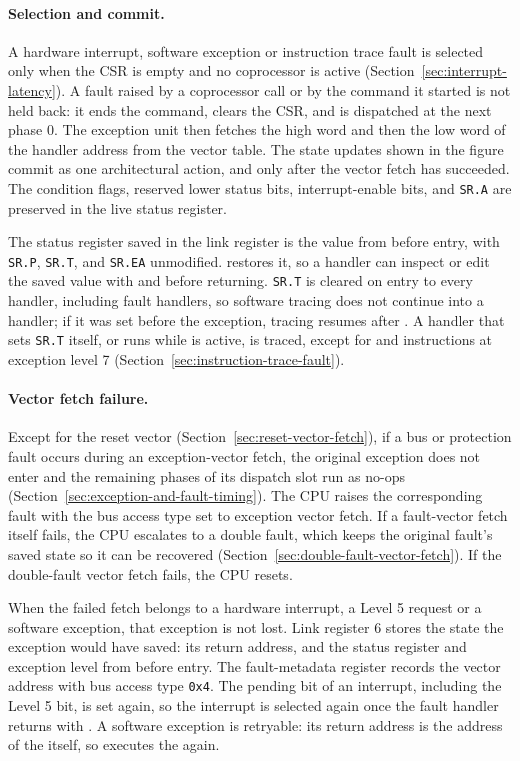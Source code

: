 \paragraph{Selection and commit.} A hardware interrupt, software exception or instruction trace fault is selected only when the CSR is empty and no
coprocessor is active (Section~\ref{sec:interrupt-latency}). A fault raised by a coprocessor call or by the command it
started is not held back: it ends the command, clears the CSR, and is dispatched at the next phase 0. The exception
unit then fetches the high word and then the low word of the handler address from the vector table. The state updates
shown in the figure commit as one architectural action, and only after the vector fetch has succeeded. The condition
flags, reserved lower status bits, interrupt-enable bits, and \texttt{SR.A} are preserved in the live status register.

The status register saved in the link register is the value from before entry, with \texttt{SR.P}, \texttt{SR.T}, and
\texttt{SR.EA} unmodified.  restores it, so a handler can inspect or edit the saved value with
 and  before returning. \texttt{SR.T} is cleared on entry to every handler, including
fault handlers, so software tracing does not continue into a handler; if it was set before the exception, tracing
resumes after . A handler that sets \texttt{SR.T} itself, or runs while  is active, is
traced, except for  and instructions at exception level 7 (Section~\ref{sec:instruction-trace-fault}).

\paragraph{Vector fetch failure.} Except for the reset vector (Section~\ref{sec:reset-vector-fetch}), if a bus or protection fault occurs during an
exception-vector fetch, the original exception does not enter and the remaining phases of its dispatch slot run as
no-ops (Section~\ref{sec:exception-and-fault-timing}). The CPU raises the corresponding fault with the bus access type
set to exception vector fetch. If a fault-vector fetch itself fails, the CPU escalates to a double fault, which keeps
the original fault's saved state so it can be recovered (Section~\ref{sec:double-fault-vector-fetch}). If the
double-fault vector fetch fails, the CPU resets.

When the failed fetch belongs to a hardware interrupt, a Level 5 request or a software exception, that exception is not
lost. Link register 6 stores the state the exception would have saved: its return address, and the status register and
exception level from before entry. The fault-metadata register records the vector address with bus access type
\texttt{0x4}. The pending bit of an interrupt, including the Level 5 bit, is set again, so the interrupt is selected
again once the fault handler returns with . A software exception is retryable: its return address is the
address of the  itself, so  executes the  again.

